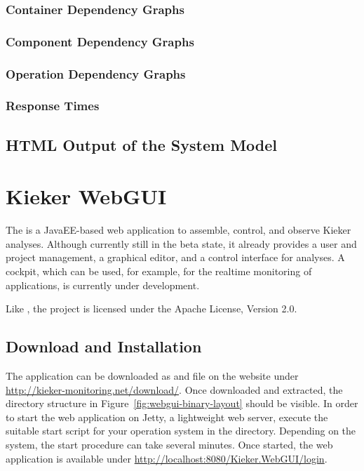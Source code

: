 			\subsubsection{Container Dependency Graphs}
			\subsubsection{Component Dependency Graphs}
			\subsubsection{Operation Dependency Graphs}
			\subsubsection{Response Times}
		\subsection{HTML Output of the System Model}	
			
	\section{Kieker WebGUI}
			
		The \KiekerWebGUI{} is a JavaEE-based web application to assemble, control, and observe Kieker analyses. Although currently still in the beta state, it already provides a user and project management, a graphical editor, and a control interface for analyses. A cockpit, which can be used, for example, for the realtime monitoring of applications, is currently under development.

		Like \Kieker{}, the \KiekerWebGUI{} project is licensed under the Apache License, Version 2.0. 
		
		\subsection{Download and Installation}
		
			The application can be downloaded as  and  file on the \Kieker{} website under \url{http://kieker-monitoring.net/download/}. Once downloaded and extracted, the directory structure in Figure~\ref{fig:webgui-binary-layout} should be visible. In order to start the web application on Jetty, a lightweight web server, execute the suitable start script for your operation system in the  directory. Depending on the system, the start procedure can take several minutes. Once started, the web application is available under \url{http://localhost:8080/Kieker.WebGUI/login}.
			
